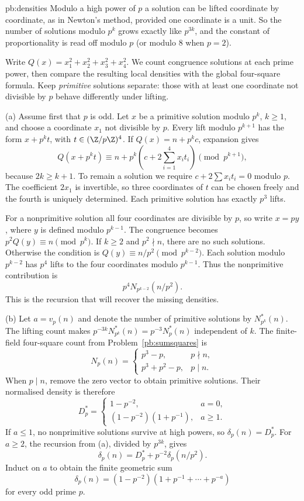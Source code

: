 \begin{solution}{pb:densities}
\idea Modulo a high power of $p$ a solution can be lifted coordinate by coordinate, as in Newton's method, provided one coordinate is a unit. So the number of solutions
modulo $p^k$ grows exactly like $p^{3k}$, and the constant of proportionality is read off modulo $p$ (or modulo $8$ when $p=2$).

\writeup Write $Q(x)=x_1^2+x_2^2+x_3^2+x_4^2$. We count congruence solutions at each prime power, then compare the resulting local densities with the global four-square formula. Keep \emph{primitive} solutions separate: those with at least one coordinate not divisible by $p$ behave differently under lifting.

(a) Assume first that $p$ is odd. Let $x$ be a primitive solution modulo $p^k$, $k\ge1$, and choose a coordinate $x_1$ not divisible by $p$. Every lift modulo $p^{k+1}$ has the form $x+p^kt$, with $t\in(\Z/p\Z)^4$. If $Q(x)=n+p^kc$, expansion gives
\[
Q(x+p^kt)\equiv n+p^k\left(c+2\sum_{i=1}^4x_it_i\right)
\pmod{p^{k+1}},
\]
because $2k\ge k+1$. To remain a solution we require
$c+2\sum x_it_i=0$ modulo $p$. The coefficient $2x_1$ is invertible, so three coordinates of $t$ can be chosen freely and the fourth is uniquely determined. Each primitive solution has exactly $p^3$ lifts.

For a nonprimitive solution all four coordinates are divisible by $p$, so write $x=py$, where $y$ is defined modulo $p^{k-1}$. The congruence becomes $p^2Q(y)\equiv n\pmod{p^k}$. If $k\ge2$ and $p^2\nmid n$, there are no such solutions. Otherwise the condition is
$Q(y)\equiv n/p^2\pmod{p^{k-2}}$. Each solution modulo $p^{k-2}$ has $p^4$ lifts to the four coordinates modulo $p^{k-1}$. Thus the nonprimitive contribution is
\[
p^4N_{p^{k-2}}(n/p^2).
\]
This is the recursion that will recover the missing densities.

(b) Let $a=v_p(n)$ and denote the number of primitive solutions by $N^*_{p^k}(n)$. The lifting count makes
$p^{-3k}N^*_{p^k}(n)=p^{-3}N_p^*(n)$ independent of $k$. The finite-field four-square count from Problem~\ref{pb:sumsquares} is
\[
N_p(n)=
\begin{cases}
p^3-p,&p\nmid n,\\
p^3+p^2-p,&p\mid n.
\end{cases}
\]
When $p\mid n$, remove the zero vector to obtain primitive solutions. Their normalised density is therefore
\[
D_p^*=
\begin{cases}
1-p^{-2},&a=0,\\
(1-p^{-2})(1+p^{-1}),&a\ge1.
\end{cases}
\]
If $a\le1$, no nonprimitive solutions survive at high powers, so $\delta_p(n)=D_p^*$. For $a\ge2$, the recursion from (a), divided by $p^{3k}$, gives
\[
\delta_p(n)=D_p^*+p^{-2}\delta_p(n/p^2).
\]
Induct on $a$ to obtain the finite geometric sum
\[
\boxed{\delta_p(n)=(1-p^{-2})(1+p^{-1}+\cdots+p^{-a})}
\]
for every odd prime $p$.


\end{solution}
